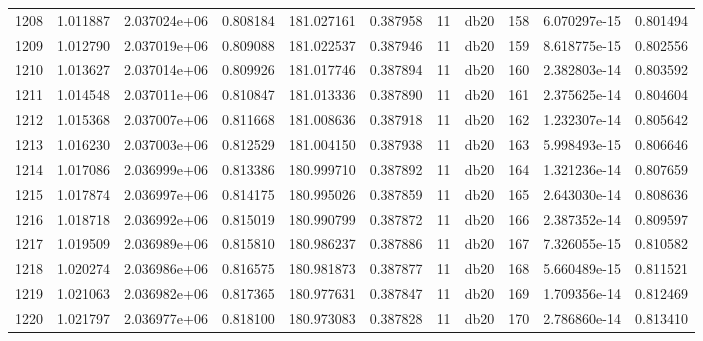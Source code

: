 \begin{tabular}{lrrrrrrlrrr}
1208 &    1.011887 &        2.037024e+06 &  0.808184 &              181.027161 &    0.387958 &      11 &         db20 &    158 &   6.070297e-15 &      0.801494 \\
1209 &    1.012790 &        2.037019e+06 &  0.809088 &              181.022537 &    0.387946 &      11 &         db20 &    159 &   8.618775e-15 &      0.802556 \\
1210 &    1.013627 &        2.037014e+06 &  0.809926 &              181.017746 &    0.387894 &      11 &         db20 &    160 &   2.382803e-14 &      0.803592 \\
1211 &    1.014548 &        2.037011e+06 &  0.810847 &              181.013336 &    0.387890 &      11 &         db20 &    161 &   2.375625e-14 &      0.804604 \\
1212 &    1.015368 &        2.037007e+06 &  0.811668 &              181.008636 &    0.387918 &      11 &         db20 &    162 &   1.232307e-14 &      0.805642 \\
1213 &    1.016230 &        2.037003e+06 &  0.812529 &              181.004150 &    0.387938 &      11 &         db20 &    163 &   5.998493e-15 &      0.806646 \\
1214 &    1.017086 &        2.036999e+06 &  0.813386 &              180.999710 &    0.387892 &      11 &         db20 &    164 &   1.321236e-14 &      0.807659 \\
1215 &    1.017874 &        2.036997e+06 &  0.814175 &              180.995026 &    0.387859 &      11 &         db20 &    165 &   2.643030e-14 &      0.808636 \\
1216 &    1.018718 &        2.036992e+06 &  0.815019 &              180.990799 &    0.387872 &      11 &         db20 &    166 &   2.387352e-14 &      0.809597 \\
1217 &    1.019509 &        2.036989e+06 &  0.815810 &              180.986237 &    0.387886 &      11 &         db20 &    167 &   7.326055e-15 &      0.810582 \\
1218 &    1.020274 &        2.036986e+06 &  0.816575 &              180.981873 &    0.387877 &      11 &         db20 &    168 &   5.660489e-15 &      0.811521 \\
1219 &    1.021063 &        2.036982e+06 &  0.817365 &              180.977631 &    0.387847 &      11 &         db20 &    169 &   1.709356e-14 &      0.812469 \\
1220 &    1.021797 &        2.036977e+06 &  0.818100 &              180.973083 &    0.387828 &      11 &         db20 &    170 &   2.786860e-14 &      0.813410 \\

\end{tabular}
